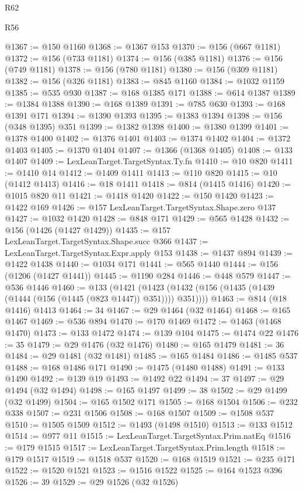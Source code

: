 \begin{lexlean}{R62}
\begin{lexlean}{R56}
\begin{coremodule}
{{{{{{{{{{{{{{{{{{{{{{{{{{{{{{{{{{{{{{{{{{{{{{{{{{{{{{{{{{{{{{{{{{{{{{{{{{{{{{{{{{{{{{{{{{{{{{{{{{{{{{{{{{{{{{{{{{{{{{{{{{{{{{{{{{{{{{{{{{{{{{{{{{{{{{{{{{{{{{{{{{{{{{{{{{{{{{{{{{{{{{{{{{{{{{{{{{{{{{{{{{{{{{{{{{{@1367 := @150 @1160
@1368 := @1367 @153
@1370 := @156 (@667 @1181)
@1372 := @156 (@733 @1181)
@1374 := @156 (@385 @1181)
@1376 := @156 (@749 @1181)
@1378 := @156 (@780 @1181)
@1380 := @156 (@309 @1181)
@1382 := @156 (@326 @1181)
@1383 := @845 @1160
@1384 := @1032 @1159
@1385 := @535 @930
@1387 := @168 @1385 @171
@1388 := @614 @1387
@1389 := @1384 @1388
@1390 := @168 @1389
@1391 := @785 @630
@1393 := @168 @1391 @171
@1394 := @1390 @1393
@1395 := @1383 @1394
@1398 := @156 (@348 @1395) @351
@1399 := @1382 @1398
@1400 := @1380 @1399
@1401 := @1378 @1400
@1402 := @1376 @1401
@1403 := @1374 @1402
@1404 := @1372 @1403
@1405 := @1370 @1404
@1407 := @1366 (@1368 @1405)
@1408 := @133 @1407
@1409 := LexLeanTarget.TargetSyntax.Ty.fn
@1410 := @10 @820
@1411 := @1410 @14
@1412 := @1409 @1411
@1413 := @110 @820
@1415 := @10 (@1412 @1413)
@1416 := @18 @1411
@1418 := @814 (@1415 @1416)
@1420 := @1015 @820 @11
@1421 := @1418 @1420
@1422 := @150 @1420
@1423 := @1422 @169
@1426 := @157 LexLeanTarget.TargetSyntax.Shape.zero @137
@1427 := @1032 @1420
@1428 := @848 @171
@1429 := @565 @1428
@1432 := @156 (@1426 (@1427 @1429))
@1435 := @157 LexLeanTarget.TargetSyntax.Shape.succ @366
@1437 := LexLeanTarget.TargetSyntax.Expr.apply @153
@1438 := @1437 @894
@1439 := @1422 @1438
@1440 := @1034 @171
@1441 := @565 @1440
@1444 := @156 (@1206 (@1427 @1441))
@1445 := @1190 @284
@1446 := @448 @579
@1447 := @536 @1446
@1460 := @133
    (@1421 (@1423 (@1432 (@156 (@1435 (@1439 (@1444 (@156 (@1445 (@823 @1447)) @351)))) @351))))
@1463 := @814 (@18 @1416) @1413
@1464 := 34
@1467 := @29 @1464 (@32 @1464)
@1468 := @165 @1467
@1469 := @536 @894
@1470 := @170 @1469
@1472 := @1463 (@1468 @1470)
@1473 := @133 @1472
@1474 := @139 @104
@1475 := @1474 @22
@1476 := 35
@1479 := @29 @1476 (@32 @1476)
@1480 := @165 @1479
@1481 := 36
@1484 := @29 @1481 (@32 @1481)
@1485 := @165 @1484
@1486 := @1485 @537
@1488 := @168 @1486 @171
@1490 := @1475 (@1480 @1488)
@1491 := @133 @1490
@1492 := @139 @19
@1493 := @1492 @22
@1494 := 37
@1497 := @29 @1494 (@32 @1494)
@1498 := @165 @1497
@1499 := 38
@1502 := @29 @1499 (@32 @1499)
@1504 := @165 @1502 @171
@1505 := @168 @1504
@1506 := @232 @338
@1507 := @231 @1506
@1508 := @168 @1507
@1509 := @1508 @537
@1510 := @1505 @1509
@1512 := @1493 (@1498 @1510)
@1513 := @133 @1512
@1514 := @977 @11
@1515 := LexLeanTarget.TargetSyntax.Prim.natEq
@1516 := @179 @1515
@1517 := LexLeanTarget.TargetSyntax.Prim.length
@1518 := @179 @1517
@1519 := @1518 @537
@1520 := @168 @1519
@1521 := @235 @171
@1522 := @1520 @1521
@1523 := @1516 @1522
@1525 := @164 @1523 @396
@1526 := 39
@1529 := @29 @1526 (@32 @1526)
}}}}}}}}}}}}}}}}}}}}}}}}}}}}}}}}}}}}}}}}}}}}}}}}}}}}}}}}}}}}}}}}}}}}}}}}}}}}}}}}}}}}}}}}}}}}}}}}}}}}}}}}}}}}}}}}}}}}}}}}}}}}}}}}}}}}}}}}}}}}}}}}}}}}}}}}}}}}}}}}}}}}}}}}}}}}}}}}}}}}}}}}}}}}}}}}}}}}}}}}}}}}}}}}}}}
\end{coremodule}
\end{lexlean}
\end{lexlean}
